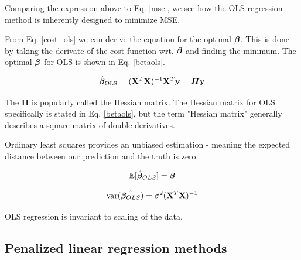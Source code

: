 Comparing the expression above to Eq. \ref{mse}, we see how the OLS regression method is inherently designed to minimize MSE.

From Eq. \ref{cost_ols} we can derive the equation for the optimal $\boldsymbol{\beta}$. This is done by taking the derivate of the cost function wrt. $\boldsymbol{\beta}$ and finding the minimum. The optimal $\boldsymbol{\beta}$ for OLS is shown in Eq. \ref{betaols}. 

\begin{equation}\label{betaols}
    \hat{\boldsymbol{\beta}}_{\text{OLS}} = (\mathbf{X}^T\mathbf{X})^{-1}\mathbf{X}^T\mathbf{y} = \boldsymbol{H}\mathbf{y}
\end{equation}

The $\boldsymbol{H}$ is popularly called the Hessian matrix. The Hessian matrix for OLS specifically is stated in Eq. \ref{betaols}, but the term "Hessian matrix" generally describes a square matrix of double derivatives.


Ordinary least squares provides an unbiased estimation - meaning the expected distance between our prediction and the truth is zero. 

\begin{equation}
    \mathbb{E}[\hat{\boldsymbol{\beta}}_{OLS}] = \boldsymbol{\beta}
\end{equation}

\begin{equation}
   \text{var}(\hat{\boldsymbol{\beta}_{OLS}}) = \sigma^2 (\mathbf{X}^T\mathbf{X})^{-1}
\end{equation}

OLS regression is invariant to scaling of the data.



\subsection{Penalized linear regression methods}

